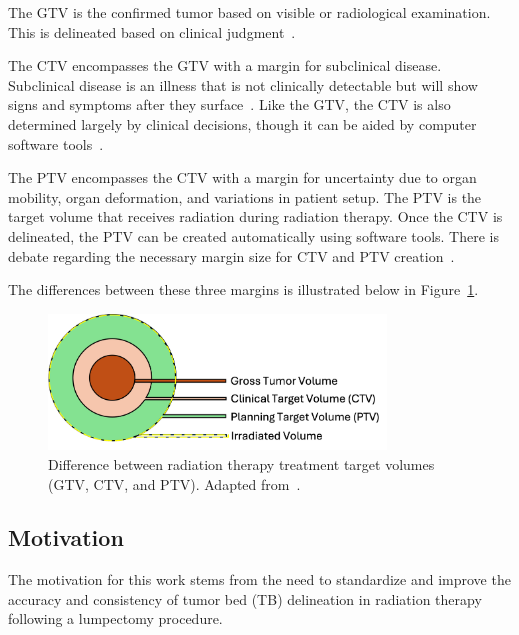 The GTV is the confirmed tumor based on visible or radiological examination. This is delineated based on clinical judgment~\cite{RefWorks:RefID:190-antolakplanning}.

The CTV encompasses the GTV with a margin for subclinical disease. Subclinical disease is an illness that is not clinically detectable but will show signs and symptoms after they surface~\cite{RefWorks:RefID:373-stöpplermedical}. Like the GTV, the CTV is also determined largely by clinical decisions, though it can be aided by computer software tools~\cite{RefWorks:RefID:190-antolakplanning}.

The PTV encompasses the CTV with a margin for uncertainty due to organ mobility, organ deformation, and variations in patient setup. The PTV is the target volume that receives radiation during radiation therapy. Once the CTV is delineated, the PTV can be created automatically using software tools. There is debate regarding the necessary margin size for CTV and PTV creation~\cite{RefWorks:RefID:190-antolakplanning}.

The differences between these three margins is illustrated below in Figure~\ref{fig:introduction:treatment_target_volumes_comparison}.
\begin{figure}[h!]
        \centering
        \includegraphics[width=0.8\textwidth]{../figs/introduction/treatment_target_volumes.png}
        \caption{Difference between radiation therapy treatment target volumes (GTV, CTV, and PTV). Adapted from~\cite{RefWorks:RefID:370-einsteinisaac}.}
        \label{fig:introduction:treatment_target_volumes_comparison}
\end{figure}


\subsection{Motivation\label{sec:introduction:motivation}}
The motivation for this work stems from the need to standardize and improve the accuracy and consistency of tumor bed (TB) delineation in radiation therapy following a lumpectomy procedure.

